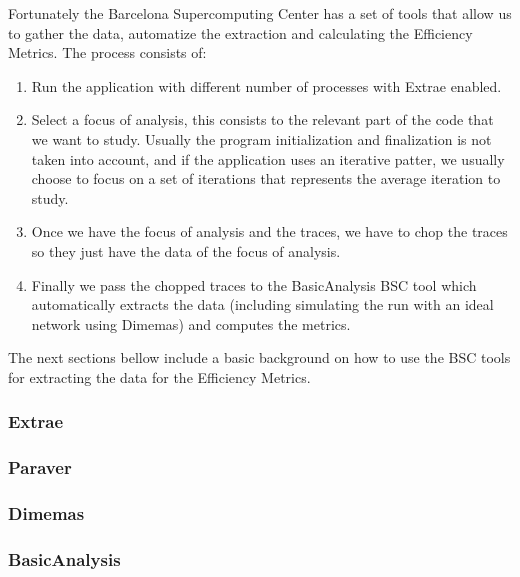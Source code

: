 \noindent
Fortunately the Barcelona Supercomputing Center has a set of tools that allow us to gather the data, automatize the extraction and calculating the Efficiency Metrics. The process consists of:
\begin{enumerate}
  \item Run the application with different number of processes with Extrae enabled.
  \item Select a focus of analysis, this consists to the relevant part of the code that we want to study. Usually the program initialization and finalization is not taken into account, and if the application uses an iterative patter, we usually choose to focus on a set of iterations that represents the average iteration to study.
  \item Once we have the focus of analysis and the traces, we have to chop the traces so they just have the data of the focus of analysis.
  \item Finally we pass the chopped traces to the BasicAnalysis BSC tool which automatically extracts the data (including simulating the run with an ideal network using Dimemas) and computes the metrics. 
\end{enumerate}

The next sections bellow include a basic background on how to use the BSC tools for extracting the data for the Efficiency Metrics.

\subsubsection{Extrae}

\subsubsection{Paraver}

\subsubsection{Dimemas}

\subsubsection{BasicAnalysis}
